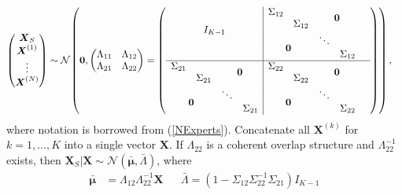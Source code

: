 \documentclass[11pt,twoside]{article}
\theoremstyle{definition}
\theoremstyle{definition}
\begin{document}
\begin{align*}
\left(\begin{matrix} \boldsymbol{X}_S \\ \boldsymbol{X}^{(1)}\\ \vdots \\ \boldsymbol{X}^{(N)} \end{matrix}\right) &\sim \mathcal{N}_{}\left( 
 \boldsymbol{0}, \left(\begin{matrix} 
\Lambda_{11} & \Lambda_{12}\\
\Lambda_{21} & \Lambda_{22}\\
 \end{matrix}\right) 
 =
 \left(\begin{array}{c c c c | c c c c c}
  \multicolumn{4}{c|}{\multirow{4}{*}{$I_{K-1}$}} & \Sigma_{12}  & &  \multicolumn{2}{c}{\multirow{2}{*}{$\boldsymbol{0}$}}   \\ 
 & &  & & &  \Sigma_{12} && & \\ 
   &  &  &  &  \multicolumn{2}{c}{\multirow{2}{*}{$\boldsymbol{0}$}}  & \ddots&  \\ 
   &  &  &  &&& &\Sigma_{12}  \\ \hline
\Sigma_{21} & &\multicolumn{2}{c|}{\multirow{2}{*}{$\boldsymbol{0}$}}& \Sigma_{22} & & \multicolumn{2}{c}{\multirow{2}{*}{$\boldsymbol{0}$}}   \\ 
 & \Sigma_{21} & & &  & \Sigma_{22} &&  \\ 
\multicolumn{2}{c}{\multirow{2}{*}{$\boldsymbol{0}$}}& \ddots &&\multicolumn{2}{c}{\multirow{2}{*}{$\boldsymbol{0}$}}  & \ddots &  \\ 
&&  & \Sigma_{21} &  &  &&\Sigma_{22} \\ 
 \end{array}\right)\right),
\end{align*}
where notation is borrowed from (\ref{NExperts}). Concatenate all $\boldsymbol{X}^{(k)}$ for $k = 1, \dots, K$ into a single vector  $\boldsymbol{X}$.  If $\Lambda_{22}$ is a coherent overlap structure and $\Lambda_{22}^{-1}$ exists, then $\boldsymbol{X}_{S} | \boldsymbol{X} \sim \mathcal{N}\left(\boldsymbol{\bar{\mu}}, \bar{\Lambda}\right)$, where
\begin{align*}
\boldsymbol{\bar{\mu}} &=  \Lambda_{12} \Lambda_{22}^{-1} \boldsymbol{X} &&  \bar{\Lambda}= (1 - \Sigma_{12} \Sigma_{22}^{-1} \Sigma_{21}) I_{K-1}
\end{align*}
\end{document}
